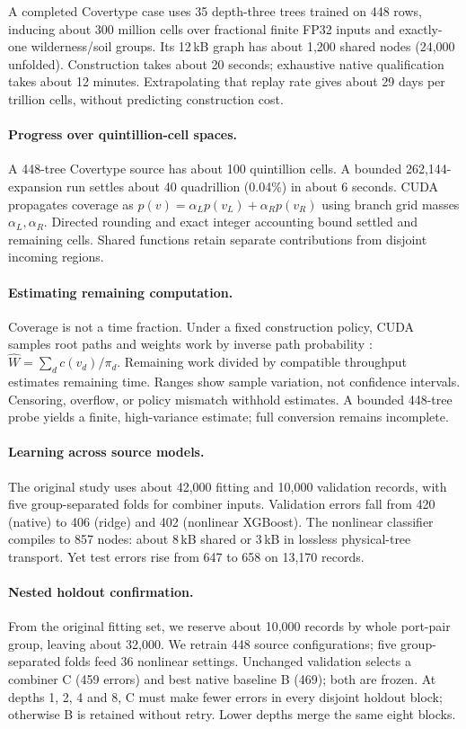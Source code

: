 A completed Covertype case \citep{blackard1998} uses 35 depth-three trees trained on 448 rows, inducing about 300 million cells over fractional finite FP32 inputs and exactly-one wilderness/soil groups. Its 12\,kB graph has about 1,200 shared nodes (24,000 unfolded). Construction takes about 20 seconds; exhaustive native qualification takes about 12 minutes. Extrapolating that replay rate gives about 29 days per trillion cells, without predicting construction cost.

\paragraph{Progress over quintillion-cell spaces.}
A 448-tree Covertype source has about 100 quintillion cells. A bounded 262,144-expansion run settles about 40 quadrillion (0.04\%) in about 6 seconds. CUDA propagates coverage as $p(v)=\alpha_Lp(v_L)+\alpha_Rp(v_R)$ using branch grid masses $\alpha_L,\alpha_R$. Directed rounding and exact integer accounting bound settled and remaining cells. Shared functions retain separate contributions from disjoint incoming regions.

\paragraph{Estimating remaining computation.}
Coverage is not a time fraction. Under a fixed construction policy, CUDA samples root paths and weights work by inverse path probability \citep{chen1992}: $\widehat W=\sum_d c(v_d)/\pi_d$. Remaining work divided by compatible throughput estimates remaining time. Ranges show sample variation, not confidence intervals. Censoring, overflow, or policy mismatch withhold estimates. A bounded 448-tree probe yields a finite, high-variance estimate; full conversion remains incomplete.

\paragraph{Learning across source models.}
The original study uses about 42,000 fitting and 10,000 validation records, with five group-separated folds for combiner inputs. Validation errors fall from 420 (native) to 406 (ridge) and 402 (nonlinear XGBoost). The nonlinear classifier compiles to 857 nodes: about 8\,kB shared or 3\,kB in lossless physical-tree transport. Yet test errors rise from 647 to 658 on 13,170 records.

\paragraph{Nested holdout confirmation.}
From the original fitting set, we reserve about 10,000 records by whole port-pair group, leaving about 32,000. We retrain 448 source configurations; five group-separated folds feed 36 nonlinear settings. Unchanged validation selects a combiner C (459 errors) and best native baseline B (469); both are frozen. At depths 1, 2, 4 and 8, C must make fewer errors in every disjoint holdout block; otherwise B is retained without retry. Lower depths merge the same eight blocks.

